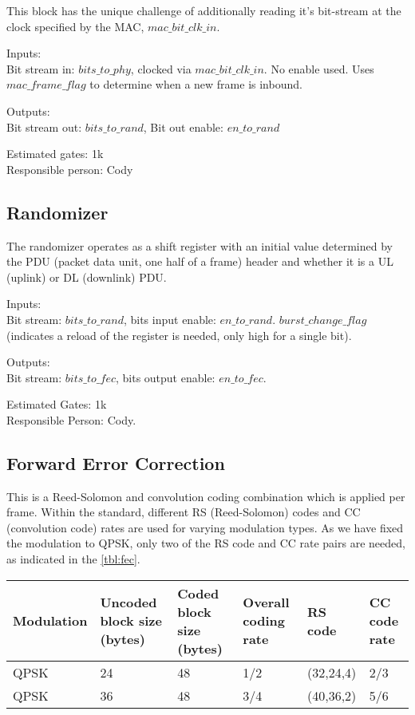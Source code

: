 \documentclass[10pt]{article}
\begin{document}
	This block has the unique challenge of additionally reading it's
	bit-stream at the clock specified by the MAC, $mac\_bit\_clk\_in$.

	Inputs: \\
	Bit stream in: $bits\_to\_phy$, clocked via $mac\_bit\_clk\_in$.  No
	enable used. Uses $mac\_frame\_flag$ to determine when a new frame is
	inbound.
	
	Outputs: \\
	Bit stream out: $bits\_to\_rand$, Bit out enable: $en\_to\_rand$

	Estimated gates: 1k \\
	Responsible person: Cody

	\subsection{Randomizer}
	\label{sec:rand}
	The randomizer operates as a shift register with an initial value
	determined by the PDU (packet data unit, one half of a frame) header
	and whether it is a UL (uplink) or DL (downlink) PDU.

	Inputs: \\
	Bit stream: $bits\_to\_rand$, bits input enable: $en\_to\_rand$.
	$burst\_change\_flag$ (indicates a reload of the register is needed,
	only high for a single bit).

	Outputs: \\
	Bit stream: $bits\_to\_fec$, bits output enable: $en\_to\_fec$.

	Estimated Gates: 1k \\
	Responsible Person: Cody.

	\subsection{Forward Error Correction}
	\label{sec:fec}
	This is a Reed-Solomon and convolution coding combination which is
	applied per frame. Within the standard, different RS (Reed-Solomon)
	codes and CC (convolution code) rates are used for varying modulation
	types. As we have fixed the modulation to QPSK, only two of the RS
	code and CC rate pairs are needed, as indicated in the \autoref{tbl:fec}.
	
	

		\begin{tabular}{p{2cm}|p{2cm}|p{2cm}|p{2cm}|p{2cm}|p{2cm}}
		\label{tbl:fec}
			Modulation & Uncoded block size (bytes) & Coded block size (bytes) &
			Overall coding rate & RS code & CC code rate \\ \hline
			QPSK & 24 & 48 & 1/2 & (32,24,4) & 2/3 \\
			QPSK & 36 & 48 & 3/4 & (40,36,2) & 5/6
		\end{tabular}
\end{document}
